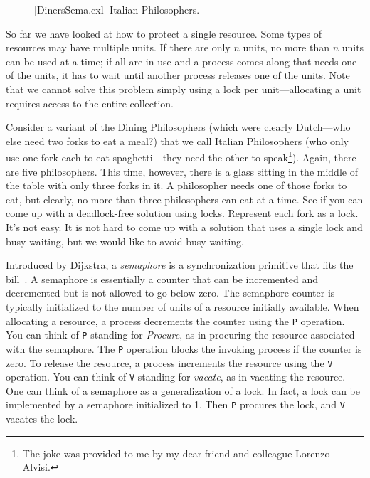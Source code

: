 \documentclass{report}
\newenvironment{code}{
\tcolorbox
}{
\endtcolorbox
}
\begin{document}
\begin{figure}
\begin{code}
\end{code}
\caption{[DinersSema.cxl] Italian Philosophers.}
\label{fig:dinerssema}
\end{figure}

So far we have looked at how to protect a single resource.
Some types of resources may have multiple units.
If there are only $n$ units, no more than $n$ units can be used at a time;
if all are in use and a process comes along that needs one of the units,
it has to wait until another process releases one of the units.
Note that we cannot solve this problem simply using a lock per unit---allocating
a unit requires access to the entire collection.

Consider a variant of the Dining Philosophers (which were clearly Dutch---who
else need two forks to eat a meal?) that we call Italian Philosophers (who only
use one fork each to eat spaghetti---they need the other to speak\footnote{The joke
was provided to me by my dear friend and colleague Lorenzo Alvisi.}).
Again, there are five philosophers.
This time, however, there is a glass sitting in the middle of the table with only
three forks in it.  A philosopher needs one of those forks to eat, but clearly,
no more than three philosophers can eat at a time.
See if you can come up with a deadlock-free solution using locks.  Represent
each fork as a lock.  It's not easy.
It is not hard to come up with a solution that uses a single lock
and busy waiting, but we would like to avoid busy waiting.

Introduced by Dijkstra,
a \emph{semaphore} is a synchronization primitive that fits the bill~\cite{EWD35}.
A semaphore is essentially
a counter that can be incremented and decremented but is not allowed to go
below zero.  The semaphore counter is typically initialized to the number of
units of a resource initially available.
When allocating a resource, a process decrements the
counter using the \texttt{P}
operation.  You can think of \texttt{P} standing
for \emph{Procure}, as in procuring the resource associated with the semaphore.
The \texttt{P} operation blocks the invoking process if the counter is zero.
To release the resource, a process increments the resource using the
\texttt{V}
operation.  You can think of \texttt{V} standing for \emph{vacate},
as in vacating the resource.
One can think of a semaphore as a generalization of a lock.  In fact, a
lock can be implemented by a semaphore initialized to 1.  Then \texttt{P}
procures the lock, and \texttt{V} vacates the lock.
\end{document}
